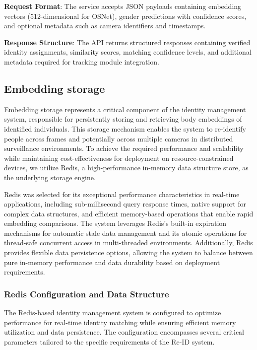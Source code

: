 \textbf{Request Format}: The service accepts JSON payloads containing embedding vectors (512-dimensional for OSNet), gender predictions with confidence scores, and optional metadata such as camera identifiers and timestamps.

\textbf{Response Structure}: The API returns structured responses containing verified identity assignments, similarity scores, matching confidence levels, and additional metadata required for tracking module integration.

\subsection{Embedding storage}

Embedding storage represents a critical component of the identity management system, responsible for persistently storing and retrieving body embeddings of identified individuals. This storage mechanism enables the system to re-identify people across frames and potentially across multiple cameras in distributed surveillance environments. To achieve the required performance and scalability while maintaining cost-effectiveness for deployment on resource-constrained devices, we utilize Redis, a high-performance in-memory data structure store, as the underlying storage engine.

Redis was selected for its exceptional performance characteristics in real-time applications, including sub-millisecond query response times, native support for complex data structures, and efficient memory-based operations that enable rapid embedding comparisons. The system leverages Redis's built-in expiration mechanisms for automatic stale data management and its atomic operations for thread-safe concurrent access in multi-threaded environments. Additionally, Redis provides flexible data persistence options, allowing the system to balance between pure in-memory performance and data durability based on deployment requirements.

\subsubsection{Redis Configuration and Data Structure}

The Redis-based identity management system is configured to optimize performance for real-time identity matching while ensuring efficient memory utilization and data persistence. The configuration encompasses several critical parameters tailored to the specific requirements of the Re-ID system.

